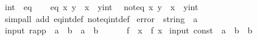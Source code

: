 \begin{isabellebody}
\endisatagproof
{\isafoldproof}%
%
\isadelimproof
%
\endisadelimproof
\isanewline
\isanewline
{}\isamarkupfalse%
\isanewline
\isanewline
{}\isamarkupfalse%
\ int\ {\isacharcolon}{\isacharcolon}\ eq\isanewline
{}\ \isanewline
\isanewline
{}\isamarkupfalse%
\isanewline
\ \ {\isachardoublequoteopen}eq\ x\ y\ {\isasymlongleftrightarrow}\ x\ {\isacharequal}\ {\isacharparenleft}y{\isacharcolon}{\isacharcolon}int{\isacharparenright}{\isachardoublequoteclose}\isanewline
\isanewline
{}\isamarkupfalse%
\isanewline
\ \ {\isachardoublequoteopen}not{\isacharunderscore}eq\ x\ y\ {\isasymlongleftrightarrow}\ x\ {\isasymnoteq}\ {\isacharparenleft}y{\isacharcolon}{\isacharcolon}int{\isacharparenright}{\isachardoublequoteclose}\isanewline
\isanewline
{}\isamarkupfalse%
%
\isadelimproof
\ %
\endisadelimproof
%
\isatagproof
{}\isamarkupfalse%
\isanewline
{}\isamarkupfalse%
\ {\isacharparenleft}simp{\isacharunderscore}all\ add{\isacharcolon}\ eq{\isacharunderscore}int{\isacharunderscore}def\ not{\isacharunderscore}eq{\isacharunderscore}int{\isacharunderscore}def{\isacharparenright}%
\endisatagproof
{\isafoldproof}%
%
\isadelimproof
%
\endisadelimproof
\isanewline
\isanewline
{}\isamarkupfalse%
%
\isamarkuptrue%
\isamarkupfalse%
\ error\ {\isacharcolon}{\isacharcolon}\ {\isachardoublequoteopen}string\ {\isasymRightarrow}\ {\isacharprime}a{\isachardoublequoteclose}\isanewline
\isanewline
{}\isamarkupfalse%
\ {\isacharparenleft}input{\isacharparenright}\ rapp\ {\isacharcolon}{\isacharcolon}\ {\isachardoublequoteopen}{\isacharparenleft}{\isacharprime}a\ {\isasymRightarrow}\ {\isacharprime}b{\isacharparenright}\ {\isasymRightarrow}\ {\isacharprime}a\ {\isasymRightarrow}\ {\isacharprime}b{\isachardoublequoteclose}\ {\isacharparenleft}\ {\isachardoublequoteopen}{\isachardollar}{\isachardoublequoteclose}\ {}{}{\isacharparenright}\ \isanewline
\ \ {\isachardoublequoteopen}f\ {\isachardollar}\ x\ {\isasymequiv}\ f\ x{\isachardoublequoteclose}\isanewline
\isanewline
{}\isamarkupfalse%
\ {\isacharparenleft}input{\isacharparenright}\ const\ {\isacharcolon}{\isacharcolon}\ {\isachardoublequoteopen}{\isacharprime}a\ {\isasymRightarrow}\ {\isacharprime}b\ {\isasymRightarrow}\ {\isacharprime}b{\isachardoublequoteclose}\ \isanewline

\end{isabellebody}
